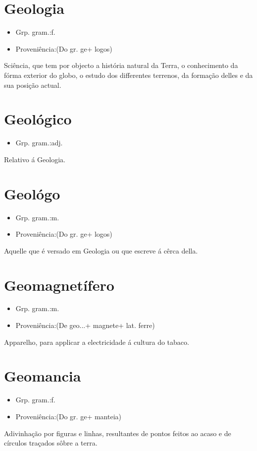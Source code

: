 \section{Geologia}
\begin{itemize}
\item {Grp. gram.:f.}
\end{itemize}
\begin{itemize}
\item {Proveniência:(Do gr. \textunderscore ge\textunderscore  + \textunderscore logos\textunderscore )}
\end{itemize}
Sciência, que tem por objecto a história natural da Terra, o conhecimento da fórma exterior do globo, o estudo dos differentes terrenos, da formação delles e da sua posição actual.
\section{Geológico}
\begin{itemize}
\item {Grp. gram.:adj.}
\end{itemize}
Relativo á Geologia.
\section{Geológo}
\begin{itemize}
\item {Grp. gram.:m.}
\end{itemize}
\begin{itemize}
\item {Proveniência:(Do gr. \textunderscore ge\textunderscore  + \textunderscore logos\textunderscore )}
\end{itemize}
Aquelle que é versado em Geologia ou que escreve á cêrca della.
\section{Geomagnetífero}
\begin{itemize}
\item {Grp. gram.:m.}
\end{itemize}
\begin{itemize}
\item {Proveniência:(De \textunderscore geo...\textunderscore  + \textunderscore magnete\textunderscore  + lat. \textunderscore ferre\textunderscore )}
\end{itemize}
Apparelho, para applicar a electricidade á cultura do tabaco.
\section{Geomancia}
\begin{itemize}
\item {Grp. gram.:f.}
\end{itemize}
\begin{itemize}
\item {Proveniência:(Do gr. \textunderscore ge\textunderscore  + \textunderscore manteia\textunderscore )}
\end{itemize}
Adivinhação por figuras e linhas, resultantes de pontos feitos ao acaso e de círculos traçados sôbre a terra.
